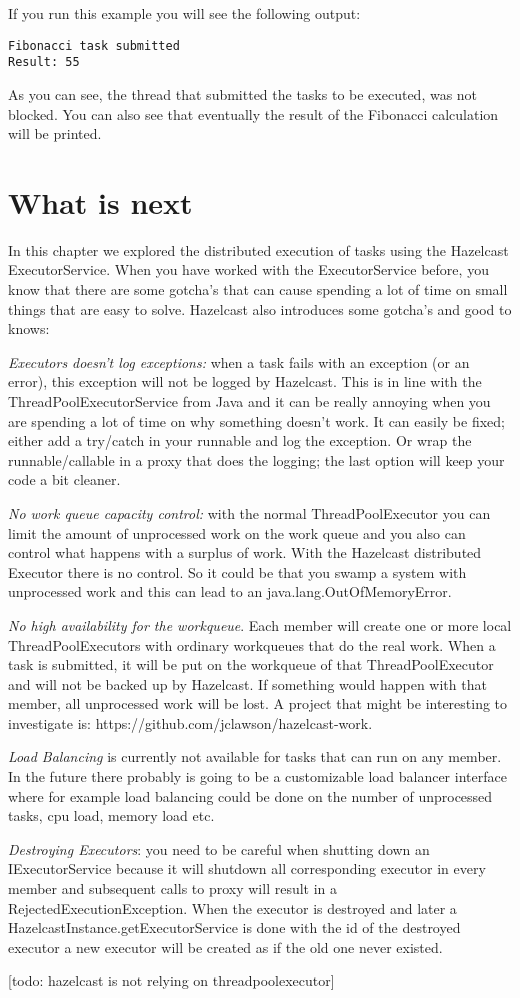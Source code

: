 If you run this example you will see the following output:
\begin{lstlisting}
Fibonacci task submitted
Result: 55
\end{lstlisting}
As you can see, the thread that submitted the tasks to be executed, was not blocked. You can also see that eventually the result of the Fibonacci calculation will be printed. 

\section{What is next}
In this chapter we explored the distributed execution of tasks using the Hazelcast ExecutorService. When you have worked with the ExecutorService before, you know that there are some gotcha's that can cause spending a lot of time on small things that are easy to solve. Hazelcast also introduces some gotcha's and good to knows:

\emph{Executors doesn't log exceptions:} when a task fails with an exception (or an error), this exception will not be logged by Hazelcast. This is in line with the ThreadPoolExecutorService from Java and it can be really annoying when you are spending a lot of time on why something doesn't work. It can easily be fixed; either add a try/catch in your runnable and log the exception. Or wrap the runnable/callable in a proxy that does the logging; the last option will keep your code a bit cleaner. 

\emph{No work queue capacity control:} with the normal ThreadPoolExecutor you can limit the amount of unprocessed work on the work queue and you also can control what happens with a surplus of work. With the Hazelcast distributed Executor there is no control. So it could be that you swamp a system with unprocessed work and this can lead to an java.lang.OutOfMemoryError.

\emph{No high availability for the workqueue}. Each member will create one or more local ThreadPoolExecutors with ordinary workqueues that do the real work. When a task is submitted, it will be put on the workqueue of that ThreadPoolExecutor and will not be backed up by Hazelcast. If something would happen with that member, all unprocessed work will be lost. A project that might be interesting to investigate is: https://github.com/jclawson/hazelcast-work.

\emph{Load Balancing} is currently not available for tasks that can run on any member. In the future there probably is going to be a customizable load balancer interface where for example load balancing could be done on the number of unprocessed tasks, cpu load, memory load etc.

\emph{Destroying Executors}: you need to be careful when shutting down an IExecutorService because it will shutdown all corresponding executor in every member and subsequent calls to proxy will result in a RejectedExecutionException. When the executor is destroyed and later a HazelcastInstance.getExecutorService is done with the id of the destroyed executor a new executor will be created as if the old one never existed.

[todo: hazelcast is not relying on threadpoolexecutor]
